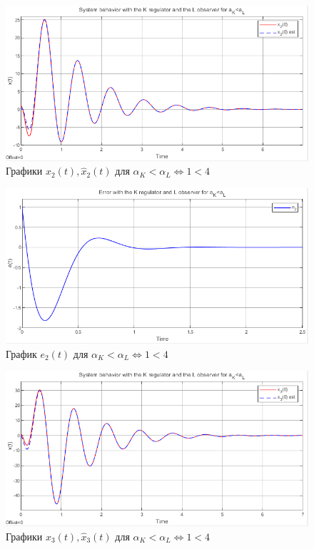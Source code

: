 \documentclass[a4paper, 12pt]{article}
\begin{document}
    \newpage
    \vspace*{20mm}
    \begin{figure}[H]
        \centering
        \includegraphics[scale=0.8]{2task_aKlaL_x2.png}
        \captionsetup{skip=0pt}
        \caption{Графики $x_2(t),\hat{x}_2(t)$ для $\alpha_K<\alpha_L\Leftrightarrow1<4$}
        \label{2task_aKlaL_x2}
    \end{figure}
    \begin{figure}[H]
        \centering
        \includegraphics[scale=0.8]{2task_aKlaL_e2.png}
        \captionsetup{skip=0pt}
        \caption{График $e_2(t)$ для $\alpha_K<\alpha_L\Leftrightarrow1<4$}
        \label{2task_aKlaL_e2}
    \end{figure}
    \newpage
    \vspace*{20mm}
    \begin{figure}[H]
        \centering
        \includegraphics[scale=0.8]{2task_aKlaL_x3.png}
        \captionsetup{skip=0pt}
        \caption{Графики $x_3(t),\hat{x}_3(t)$ для $\alpha_K<\alpha_L\Leftrightarrow1<4$}
        \label{2task_aKlaL_x3}
    \end{figure}
\end{document}
